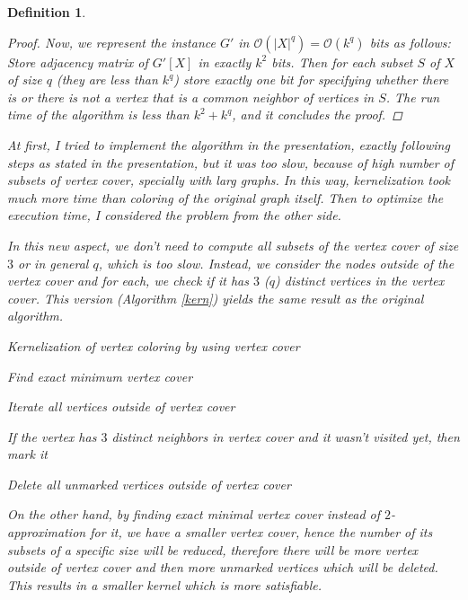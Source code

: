\documentclass[12pt]{article}
\theoremstyle{slplain}
\newtheorem{defi}{Definition}[section]
\begin{document}
\begin{defi}
\begin{proof}
Now, we represent the instance $G'$ in $\mathcal{O}(|X|^q) = \mathcal{O}(k^q)$ bits as follows: Store 
adjacency matrix of $G'[X]$ in exactly $k^2$ bits. Then for each subset $S$ of $X$ 
of size $q$ (they are less than $k^q$) store exactly one bit for specifying whether 
there is or there is not a vertex that is a common neighbor of vertices in $S$. The 
run time of the algorithm is less than $k^2 + k^q$, and it concludes the proof.
\end{proof}
\vspace{1cm}

At first, I tried to implement the algorithm in the presentation, exactly following steps as stated in the presentation, but it was too slow, because of high number of subsets of vertex cover, specially with larg graphs. In this way, kernelization took much more time than coloring of the original graph itself. Then to optimize the execution time, I considered the problem from the other side. 

In this new aspect, we don't need to compute all subsets of the vertex cover of size $3$ or in general $q$, which is too slow. Instead, we consider the nodes outside of the vertex cover and for each, we check if it has $3$ ($q$) distinct vertices in the vertex cover. This version (Algorithm \ref{kern}) yields the same result as the original algorithm. 

\vspace{1cm}

\begin{algorithm}[H]
\SetAlgoLined
\DontPrintSemicolon
  \caption{Kernelization of vertex coloring by using vertex cover}{\label{kern}}

Find exact minimum vertex cover\;

Iterate all vertices outside of vertex cover\;

If the vertex has $3$ distinct neighbors in vertex cover and it wasn't
visited yet, then mark it\;

Delete all unmarked vertices outside of vertex cover\;
\end{algorithm}

\vspace{1cm}

On the other hand, by finding exact minimal vertex cover instead of $2$-approximation for it, we have a smaller vertex cover, hence the number of its subsets of a specific size will be reduced, therefore there will be more vertex outside of vertex cover and then more unmarked vertices which will be deleted. This results in a smaller kernel which is more satisfiable.



\end{defi}
\end{document}
